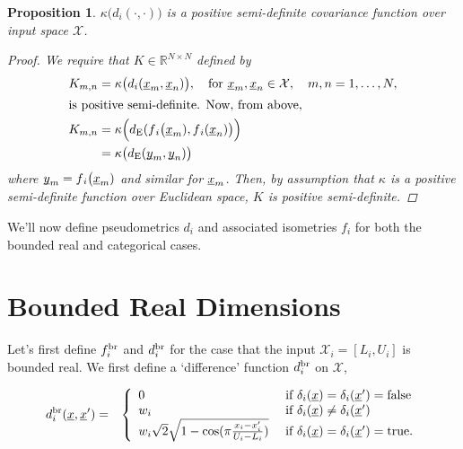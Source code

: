 \documentclass[letterpaper]{article}
\newcommand{\vect}[1]{\underline{\smash{#1}}}
\renewcommand{\v}[1]{\vect{#1}}
\newcommand{\reals}{\mathds{R}}
\newcommand{\sX}{\mathcal{X}}
\newcommand{\br}{^{\text{\textnormal{br}}}}
\newtheorem{prop}[thm]{Proposition}
\begin{document}
\begin{prop}
  $\kappa\bigl(d{_i}(\cdot,\cdot)\bigr)$ is a positive semi-definite covariance function over input space $\sX$. 
\label{prop:cont_psd_proof}
\begin{proof}
We require that $K \in \reals^{N\times N}$ defined by
\begin{align*}
 K_{m, n} & = \kappa\bigl(d{_i}(\v{x}_m,\v{x}_n)\bigr)
,\quad \text{for }
\v{x}_m, \v{x}_n \in \sX,\quad m, n = 1, \ldots, N, 
\\
\intertext{is positive semi-definite. Now, from above,}
K_{m, n} & = \kappa\Bigl(d_{\text{E}}(f{_i}\bigl(\v{x}_m), f{_i}(\v{x}_n)\bigr)\Bigr) \\
& = \kappa\bigl(d_{\text{E}}(\v{y}_m, \v{y}_n)\bigr)
\end{align*}
where $\v{y}_m = f{_i}\bigl(\v{x}_m)$ and similar for $\v{x}_m$. Then, by assumption that $\kappa$ is a positive semi-definite function over Euclidean space, $K$ is positive semi-definite. 
\end{proof}
\end{prop}

We'll now define pseudometrics $d_i$ and associated isometries $f_i$ for both the bounded real and categorical cases. 


\section{Bounded Real Dimensions}

Let's first define $f\br_i$ and $d\br_i$ for the case that the input $\sX_i=[L_i, U_i]$ is bounded real. We first define a `difference' function $d\br_i$ on $\sX$,

\begin{eqnarray}
\nonumber{}d\br_i(\v{x}, \v{x}') & = & \left\{\begin{array}{ll}
\nonumber{} 0 & \textrm{ if } \delta_i(\v{x}) = \delta_i(\v{x}') = \textrm{false}\\
\nonumber{} w_i & \textrm{ if } \delta_i(\v{x}) \neq \delta_i(\v{x}')\\
\nonumber{} w_i \sqrt{2} \sqrt{1 - \cos(\pi \frac{x_i-x_i'}{U_i-L_i})} & \textrm{ if } \delta_i(\v{x}) = \delta_i(\v{x}') = \textrm{true}. \end{array}\right.
\end{eqnarray}
\end{document}
